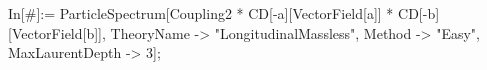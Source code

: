 In[\#]:= ParticleSpectrum[Coupling2 * CD[-a][VectorField[a]] * CD[-b][VectorField[b]], TheoryName -> "LongitudinalMassless", Method -> "Easy", MaxLaurentDepth -> 3]; 